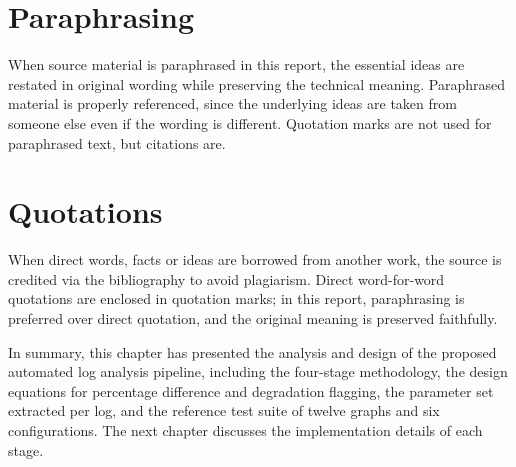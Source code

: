 \section{Paraphrasing}
When source material is paraphrased in this report, the essential ideas are restated in original wording while preserving the technical meaning. Paraphrased material is properly referenced, since the underlying ideas are taken from someone else even if the wording is different. Quotation marks are not used for paraphrased text, but citations are.

\section{Quotations}
When direct words, facts or ideas are borrowed from another work, the source is credited via the bibliography to avoid plagiarism. Direct word-for-word quotations are enclosed in quotation marks; in this report, paraphrasing is preferred over direct quotation, and the original meaning is preserved faithfully.

In summary, this chapter has presented the analysis and design of the proposed automated log analysis pipeline, including the four-stage methodology, the design equations for percentage difference and degradation flagging, the parameter set extracted per log, and the reference test suite of twelve graphs and six configurations. The next chapter discusses the implementation details of each stage.
